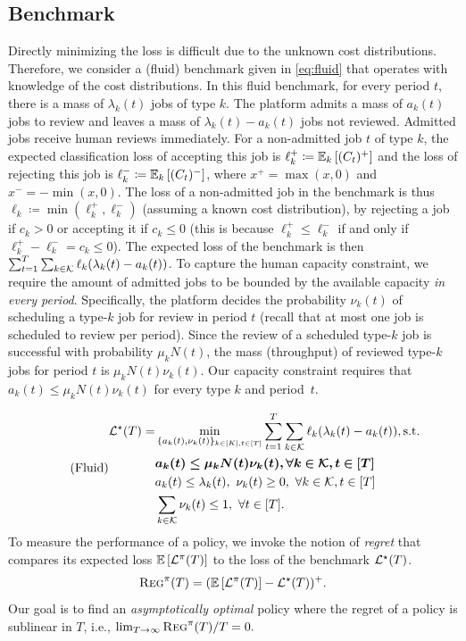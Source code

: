 \subsection{Benchmark}
Directly minimizing the loss is difficult due to the unknown cost distributions. Therefore, we consider a (fluid) benchmark given in \eqref{eq:fluid} that operates with knowledge of the cost distributions. In this fluid benchmark, for every period $t$, there is a mass of $\lambda_k(t)$ jobs of type $k$. The platform admits a mass of $a_k(t)$ jobs to review and leaves a mass of $\lambda_k(t) - a_k(t)$ jobs not reviewed. Admitted jobs receive human reviews immediately. For a non-admitted job $t$ of type $k$, the expected classification loss of accepting this job is $\ell_k^+ \coloneqq \mathbb E_{k}\left[(C_t)^+\right]$ and the loss of rejecting this job is $\ell_k^- \coloneqq \mathbb E_{k}\left[(C_t)^-\right]$, where $x^+ = \max(x,0)$ and  $x^- = -\min(x,0)$.
The loss of a non-admitted job in the benchmark is thus $\ell_k \coloneqq \min(\ell_k^+, \ell_k^-)$ (assuming a known cost distribution), by rejecting a job if $c_k > 0$ or accepting it if $c_k \leq 0$ (this is because $\ell_k^+ \leq \ell_k^-$ if and only if $\ell_k^+ - \ell_k^- = c_k \leq 0$). The expected loss of the benchmark is then $\sum_{t = 1}^T \sum_{k \in \mathcal{K}} \ell_k(\lambda_k(t) - a_k(t))$. To capture the human capacity constraint, we require the amount of admitted jobs to be bounded by the available capacity \emph{in every period}. Specifically, the platform decides the probability $\nu_k(t)$ of scheduling a type-$k$ job for review in period $t$ (recall that at most one job is scheduled to review per period). Since the review of a  scheduled type-$k$ job is successful with probability $\mu_k N(t)$, the mass (throughput) of reviewed type-$k$ jobs for period $t$ is $\mu_k N(t) \nu_k(t)$. Our capacity constraint requires that $a_k(t) \leq \mu_k N(t)\nu_k(t)$ for every type $k$ and period~$t$.

\begin{equation}\label{eq:fluid}
\tag{Fluid}
\begin{aligned}
\mathcal{L}^\star(T) = &\min_{\{a_k(t),\nu_k(t)\}_{k \in [K], t\in [T]}}\sum_{t=1}^T \sum_{k \in \mathcal{K}} \ell_k(\lambda_k(t) - a_k(t)),\text{s.t.} \\
\quad& \boldsymbol{a_k(t) \leq \mu_k N(t)\nu_k(t),\forall k \in \mathcal{K}, t \in [T]} \\
&a_k(t) \leq \lambda_k(t),~\nu_k(t) \geq 0,~\forall k \in \mathcal{K}, t\in [T] \\
& \sum_{k\in \mathcal{K}} \nu_k(t) \leq 1,~\forall t \in [T].
\end{aligned}
\end{equation}
To measure the performance of a policy, we invoke the notion of \emph{regret} that compares its expected loss $\mathbb E\left[\mathcal{L}^\pi(T)\right]$ to the loss of the benchmark $\mathcal{L}^\star(T)$.
\begin{equation}\label{eq:regre}
 \textsc{Reg}^{\pi}(T) = (\mathbb E\left[\mathcal{L}^{\pi}(T)\right] - \mathcal{L}^{\star}(T))^+.
 \end{equation}
Our goal is to find an \emph{asymptotically optimal} policy where the regret of a policy is sublinear in $T$, i.e., $\lim_{T \to \infty} \textsc{Reg}^{\pi}(T) / T = 0.$

